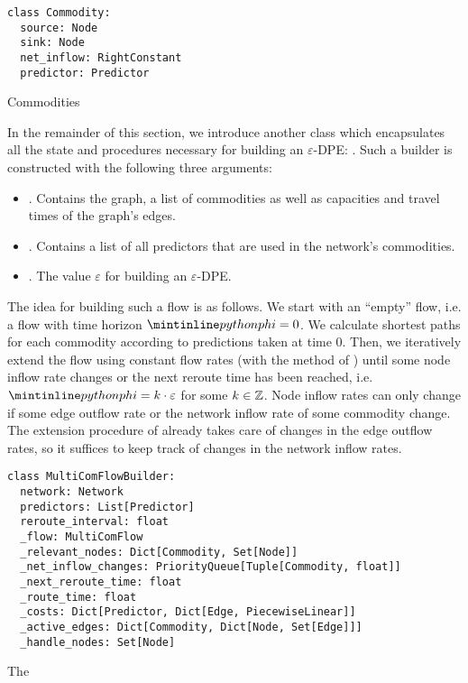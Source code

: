 \begin{classdef}
    \begin{verbatim}
class Commodity:
  source: Node
  sink: Node
  net_inflow: RightConstant
  predictor: Predictor
\end{verbatim}
\caption{Commodities}%
\label{data:commodity}
\end{classdef}

In the remainder of this section, we introduce another class which encapsulates all the state and procedures necessary for building an $\varepsilon$-DPE: .
Such a builder is constructed with the following three arguments:
\begin{itemize}
  \item {}. Contains the graph, a list of commodities as well as capacities and travel times of the graph's edges.
  \item {}. Contains a list of all predictors that are used in the network's commodities.
  \item {}. The value $\varepsilon$ for building an $\varepsilon$-DPE. 
\end{itemize}

The idea for building such a flow is as follows.
We start with an ``empty'' flow, i.e. a flow with time horizon $\code{phi}=0$.
We calculate shortest paths for each commodity according to predictions taken at time $0$.
Then, we iteratively extend the flow using constant flow rates (with the  method of )
until some node inflow rate changes or the next reroute time has been reached, i.e. $\code{phi} = k\cdot \varepsilon$ for some $k\in \mathbb{Z}$.
Node inflow rates can only change if some edge outflow rate or the network inflow rate of some commodity change.
The extension procedure of  already takes care of changes in the edge outflow rates, so it suffices to keep track of changes in the network inflow rates.  

\begin{classdef}
  \begin{verbatim}
class MultiComFlowBuilder:
  network: Network
  predictors: List[Predictor]
  reroute_interval: float
  _flow: MultiComFlow
  _relevant_nodes: Dict[Commodity, Set[Node]]
  _net_inflow_changes: PriorityQueue[Tuple[Commodity, float]]
  _next_reroute_time: float
  _route_time: float
  _costs: Dict[Predictor, Dict[Edge, PiecewiseLinear]]
  _active_edges: Dict[Commodity, Dict[Node, Set[Edge]]]
  _handle_nodes: Set[Node]
\end{verbatim}
    \caption{The }%
    \label{data:multi-com-flow-builder}
\end{classdef}

